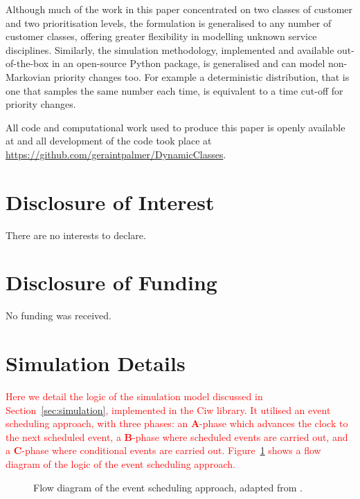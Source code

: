 \documentclass{article}
\begin{document}
Although much of the work in this paper concentrated on two classes of customer
and two prioritisation levels, the formulation is generalised to any number of
customer classes, offering greater flexibility in modelling unknown service
disciplines.
Similarly, the simulation methodology, implemented and available out-of-the-box
in an open-source Python package, is generalised and can model non-Markovian
priority changes too.
For example a deterministic distribution, that is one that samples the same
number each time, is equivalent to a time cut-off for priority changes.

All code and computational work used to produce this paper is openly available
at \cite{palmeretal24} and all development of the code took place at
\url{https://github.com/geraintpalmer/DynamicClasses}.


\section*{Disclosure of Interest}
There are no interests to declare.

\section*{Disclosure of Funding}
No funding was received.




\newpage
\appendix

\section{Simulation Details}\label{apx:simulation_logic}
\textcolor{red}{Here we detail the logic of the simulation model discussed in
Section~\ref{sec:simulation}, implemented in the Ciw library.
It utilised an event scheduling approach, with three phases: an
\textbf{A}-phase which advances the clock to the next scheduled event, a
\textbf{B}-phase where scheduled events are carried out, and a \textbf{C}-phase
where conditional events are carried out.
Figure~\ref{fig:eventscheduling} shows a flow diagram of the logic of the event
scheduling approach.}

\begin{figure}
    \centering
    
    \caption{Flow diagram of the event scheduling approach, adapted from
    \cite{palmer18}.}
    \label{fig:eventscheduling}
\end{figure}
\end{document}
